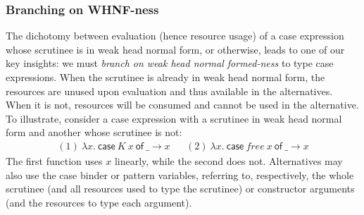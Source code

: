 \documentclass[acmsmall, screen, review]{acmart}
\newcommand{\ccase}[2]{\mathsf{case}~#1~\mathsf{of}~#2}
\begin{document}


\subsubsection{Branching on WHNF-ness}

The dichotomy between evaluation (hence resource usage) of a case expression
whose scrutinee is in weak head normal form, or otherwise, leads to one of our
key insights: we must \emph{branch on weak head normal formed-ness} to
type case expressions.
%
When the scrutinee is already in weak head normal form, the resources are
unused upon evaluation and thus available in the alternatives.
%
When it is not, resources will be consumed and cannot be used in the
alternative.
%
To illustrate, consider a case expression with a scrutinee in weak head normal
form and another whose scrutinee is not:
\[
\begin{array}{ccc}
(1)~\lambda x.~\ccase{K~x}{\_ \to x} &  & (2)~\lambda x.~\ccase{free~x}{\_ \to x}
\end{array}
\]
The first function uses $x$ linearly, while the second does not.
%
Alternatives may also use the case binder or pattern variables, referring to, respectively,
the whole scrutinee (and all resources used to type the scrutinee) or
constructor arguments (and the resources to type each argument).
\end{document}
